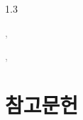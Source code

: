 \documentclass[10pt]{oblivoir}
\begin{document}
\pagestyle{empty}

\begin{center}
  \begin{spacing}{1.3}
    {\LARGE\bfseries \mytitleko}\par
    \vspace{5pt}
    \textcolor{gray}{\myauthorfirstko, \myauthorsecondko}\par
    \textcolor{gray}{\affiliationko}
  \end{spacing}
  \vspace{10pt}
  {\large\bfseries \mytitle}\par
  \vspace{5pt}
  \textcolor{gray}{\myauthorfirst, \myauthorsecond}\par
  \textcolor{gray}{\affiliation}
\end{center}





\section{참고문헌}
\printbibliography[heading=none]
\end{document}
